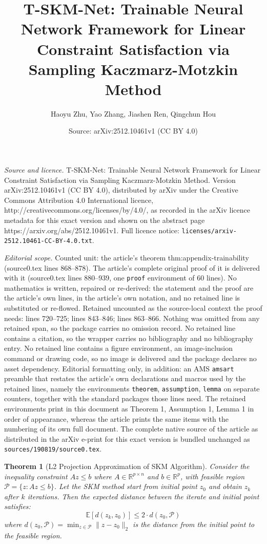 \documentclass[10pt,a4paper]{amsart}
\title{T-SKM-Net: Trainable Neural Network Framework for Linear Constraint Satisfaction via Sampling Kaczmarz-Motzkin Method}
\author{Haoyu Zhu, Yao Zhang, Jiashen Ren, Qingchun Hou}
\date{Source: arXiv:2512.10461v1 (CC BY 4.0)}
\newtheorem{theorem}{Theorem}
\begin{document}
\maketitle

\noindent\emph{Source and licence.} T-SKM-Net: Trainable Neural Network Framework for Linear Constraint Satisfaction via Sampling Kaczmarz-Motzkin Method. Version arXiv:2512.10461v1 (CC BY 4.0), distributed by arXiv under the Creative Commons Attribution 4.0 International licence, http://creativecommons.org/licenses/by/4.0/, as recorded in the arXiv licence metadata for this exact version and shown on the abstract page https://arxiv.org/abs/2512.10461v1. Full licence notice: \texttt{licenses/arxiv-2512.10461-CC-BY-4.0.txt}.\par\smallskip

\noindent\textit{Editorial scope.} Counted unit: the article's theorem thm:appendix-trainability (source0.tex lines 868--878). The article's complete original proof of it is delivered with it (source0.tex lines 880--939, one \texttt{proof} environment of 60 lines). No mathematics is written, repaired or re-derived: the statement and the proof are the article's own lines, in the article's own notation, and no retained line is substituted or re-flowed.  Retained uncounted as the source-local context the proof needs: lines 720--725; lines 843--846; lines 863--866.  Nothing was omitted from any retained span, so the package carries no omission record.  No retained line contains a citation, so the wrapper carries no bibliography and no bibliography entry.  No retained line contains a figure environment, an image-inclusion command or drawing code, so no image is delivered and the package declares no asset dependency.  Editorial formatting only, in addition: an AMS \texttt{amsart} preamble that restates the article's own declarations and macros used by the retained lines, namely the environments \texttt{theorem}, \texttt{assumption}, \texttt{lemma} on separate counters, together with the standard packages those lines need.  The retained environments print in this document as Theorem 1, Assumption 1, Lemma 1 in order of appearance, whereas the article prints the same items with the numbering of its own full document.  The complete native source of the article as distributed in the arXiv e-print for this exact version is bundled unchanged as \texttt{sources/190819/source0.tex}.
\begin{theorem}[L2 Projection Approximation of SKM Algorithm]
\label{thm:appendix-skm-l2}
Consider the inequality constraint $Az\leq b$ where $A\in \mathbb{R}^{p\times n}$ and $b \in \mathbb{R}^p$, with feasible region $\mathcal{P}=\{z: Az\leq b\}$. Let the SKM method start from initial point $z_{0}$ and obtain $z_{k}$ after $k$ iterations. Then the expected distance between the iterate and initial point satisfies:
$$\mathbb{E}[d(z_{k},z_{0})] \leq 2 \cdot d(z_{0},\mathcal{P})$$
where $d(z_0, \mathcal{P}) = \min_{z \in \mathcal{P}} \|z - z_0\|_2$ is the distance from the initial point to the feasible region.
\end{theorem}
\end{document}
